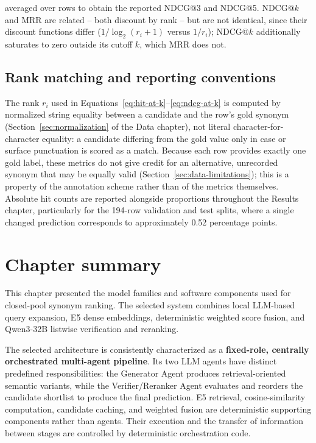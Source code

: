 averaged over rows to obtain the reported NDCG@3 and NDCG@5. NDCG@$k$ and MRR are related -- both discount by rank -- but are not identical, since their discount functions differ ($1/\log_2(r_i+1)$ versus $1/r_i$); NDCG@$k$ additionally saturates to zero outside its cutoff $k$, which MRR does not.

\subsection{Rank matching and reporting conventions}

The rank $r_i$ used in Equations~\ref{eq:hit-at-k}--\ref{eq:ndcg-at-k} is computed by normalized string equality between a candidate and the row's gold synonym (Section~\ref{sec:normalization} of the Data chapter), not literal character-for-character equality: a candidate differing from the gold value only in case or surface punctuation is scored as a match. Because each row provides exactly one gold label, these metrics do not give credit for an alternative, unrecorded synonym that may be equally valid (Section~\ref{sec:data-limitations}); this is a property of the annotation scheme rather than of the metrics themselves. Absolute hit counts are reported alongside proportions throughout the Results chapter, particularly for the 194-row validation and test splits, where a single changed prediction corresponds to approximately 0.52 percentage points.

\section{Chapter summary}

This chapter presented the model families and software components used for closed-pool synonym ranking. The selected system combines local LLM-based query expansion, E5 dense embeddings, deterministic weighted score fusion, and Qwen3-32B listwise verification and reranking.

The selected architecture is consistently characterized as a \textbf{fixed-role, centrally orchestrated multi-agent pipeline}. Its two LLM agents have distinct predefined responsibilities: the Generator Agent produces retrieval-oriented semantic variants, while the Verifier/Reranker Agent evaluates and reorders the candidate shortlist to produce the final prediction. E5 retrieval, cosine-similarity computation, candidate caching, and weighted fusion are deterministic supporting components rather than agents. Their execution and the transfer of information between stages are controlled by deterministic orchestration code.

